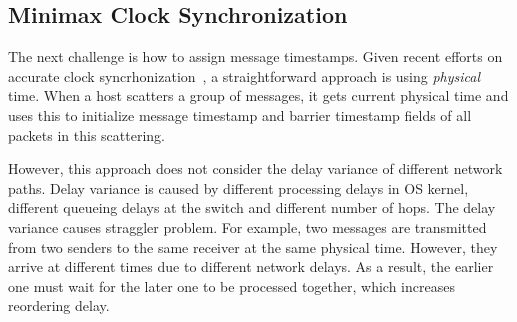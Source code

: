 \subsection{Minimax Clock Synchronization}
\label{sec:sync}


The next challenge is how to assign message timestamps. Given recent efforts on accurate clock syncrhonization~\cite{correll2005design,corbett2013spanner,lee2016globally,geng2018exploiting}, a straightforward approach is using \emph{physical} time. When a host scatters a group of messages, it gets current physical time and uses this to initialize message timestamp and barrier timestamp fields of all packets in this scattering. 

However, this approach does not consider the delay variance of different network paths. Delay variance is caused by different processing delays in OS kernel, different queueing delays at the switch and different number of hops. The delay variance causes straggler problem. For example, two messages are transmitted from two senders to the same receiver at the same physical time. However, they arrive at different times due to different network delays. As a result, the earlier one must wait for the later one to be processed together, which increases reordering delay.      


